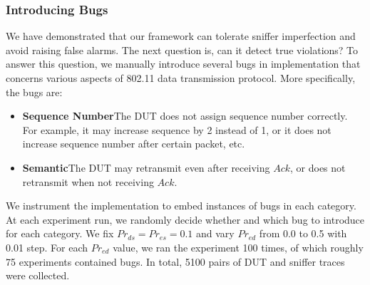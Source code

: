 \subsubsection{Introducing Bugs}

We have demonstrated that our framework can tolerate sniffer imperfection and
avoid raising false alarms.
The next question is, can it detect true violations?
To answer this question, we manually introduce several bugs in \ns{}
implementation that concerns various aspects of 802.11 data transmission
protocol.
More specifically, the bugs are:

\begin{itemize}
  \item \textbf{Sequence Number}\quad The DUT does not assign sequence number
    correctly. For example, it may increase sequence by 2 instead of 1, or it
    does not increase sequence number after certain packet, etc.
  \item \textbf{Semantic}\quad The DUT may retransmit even
    after receiving $Ack$, or does not retransmit when not receiving $Ack$.
\end{itemize}

We instrument the \ns{} implementation to embed instances of bugs in each
category. At each experiment run, we randomly decide whether and which bug to
introduce for each category. We fix $Pr_{ds}=Pr_{es}=0.1$ and vary $Pr_{ed}$
from 0.0 to 0.5 with 0.01 step. For each $Pr_{ed}$ value, we ran the experiment
100 times, of which roughly 75 experiments contained bugs. In total, 5100 pairs of
DUT and sniffer traces were collected.


